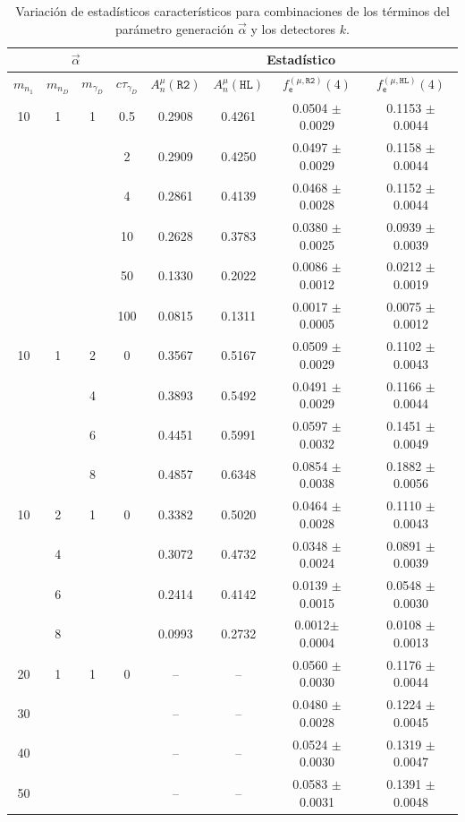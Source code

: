 \begin{table}[!t]
\centering
\footnotesize
\begin{tabular}{|cccc|cccc|}
\toprule
\multicolumn{4}{|c|}{$\vec{\alpha}$} & \multicolumn{4}{|c|}{Estadístico} \\
\hline
$m_{n_1}$ & $m_{n_D}$ & $m_{\gamma_D}$ & $c\tau_{\gamma_D}$ & 
$A_n^\mu(\texttt{R2})$ & 
$A_n^\mu(\texttt{HL})$ & 
$f^{(\mu, \texttt{R2})}_\textsf{e} (4)$ & 
$f^{(\mu, \texttt{HL})}_\textsf{e} (4)$ \\
\midrule
10 & 1 & 1 & 0.5 & 0.2908 & 0.4261 & 0.0504 $\pm$ 0.0029& 0.1153 $\pm$ 0.0044\\
& & & 2 & 0.2909 & 0.4250 & 0.0497 $\pm$ 0.0029& 0.1158 $\pm$ 0.0044\\
& & & 4 & 0.2861 & 0.4139 & 0.0468 $\pm$ 0.0028& 0.1152 $\pm$ 0.0044 \\
& & & 10 & 0.2628 & 0.3783 & 0.0380 $\pm$ 0.0025& 0.0939 $\pm$ 0.0039\\
& & & 50 & 0.1330 & 0.2022 & 0.0086 $\pm$ 0.0012& 0.0212 $\pm$ 0.0019\\
& & & 100 & 0.0815 & 0.1311 & 0.0017 $\pm$ 0.0005& 0.0075 $\pm$ 0.0012\\
\midrule
10 & 1 & 2 & 0 & 0.3567 & 0.5167 & 0.0509 $\pm$ 0.0029& 0.1102 $\pm$ 0.0043\\
& & 4 & & 0.3893 & 0.5492 & 0.0491 $\pm$ 0.0029& 0.1166 $\pm$ 0.0044\\
& & 6 & & 0.4451 & 0.5991 & 0.0597 $\pm$ 0.0032& 0.1451 $\pm$ 0.0049\\
& & 8 & & 0.4857 & 0.6348 & 0.0854 $\pm$ 0.0038& 0.1882 $\pm$ 0.0056\\
\midrule
10 & 2 & 1 & 0 & 0.3382 & 0.5020 & 0.0464 $\pm$ 0.0028& 0.1110 $\pm$ 0.0043\\
& 4 & & & 0.3072 & 0.4732 & 0.0348 $\pm$ 0.0024& 0.0891 $\pm$ 0.0039\\
& 6 & & & 0.2414 & 0.4142 & 0.0139 $\pm$ 0.0015& 0.0548 $\pm$ 0.0030 \\
& 8 & & & 0.0993 & 0.2732 & 0.0012$\pm$ 0.0004& 0.0108 $\pm$ 0.0013\\
\midrule
20 & 1 & 1 & 0 & -- & -- & 0.0560 $\pm$ 0.0030 & 0.1176 $\pm$ 0.0044 \\
30 & & & &  --  & -- & 0.0480 $\pm$ 0.0028 & 0.1224 $\pm$ 0.0045\\
40 & & & & -- & -- &  0.0524 $\pm$ 0.0030 &  0.1319 $\pm$ 0.0047 \\
50 & & & & -- & -- & 0.0583 $\pm$ 0.0031 & 0.1391 $\pm$ 0.0048 \\
\bottomrule 
\end{tabular}
\caption{Variación de estadísticos característicos para combinaciones de los términos del parámetro generación $\vec{\alpha}$ y los detectores $k$.}
\label{Numero_de_Entradas}
\end{table}



